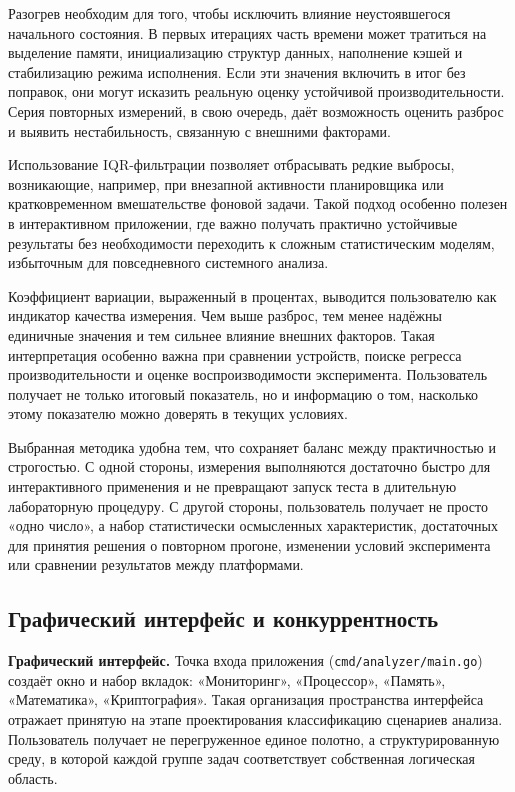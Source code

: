 Разогрев необходим для того, чтобы исключить влияние неустоявшегося начального состояния. В первых итерациях часть времени может тратиться на выделение памяти, инициализацию структур данных, наполнение кэшей и стабилизацию режима исполнения. Если эти значения включить в итог без поправок, они могут исказить реальную оценку устойчивой производительности. Серия повторных измерений, в свою очередь, даёт возможность оценить разброс и выявить нестабильность, связанную с внешними факторами.

Использование IQR-фильтрации позволяет отбрасывать редкие выбросы, возникающие, например, при внезапной активности планировщика или кратковременном вмешательстве фоновой задачи. Такой подход особенно полезен в интерактивном приложении, где важно получать практично устойчивые результаты без необходимости переходить к сложным статистическим моделям, избыточным для повседневного системного анализа.

Коэффициент вариации, выраженный в процентах, выводится пользователю как индикатор качества измерения. Чем выше разброс, тем менее надёжны единичные значения и тем сильнее влияние внешних факторов. Такая интерпретация особенно важна при сравнении устройств, поиске регресса производительности и оценке воспроизводимости эксперимента. Пользователь получает не только итоговый показатель, но и информацию о том, насколько этому показателю можно доверять в текущих условиях.

Выбранная методика удобна тем, что сохраняет баланс между практичностью и строгостью. С одной стороны, измерения выполняются достаточно быстро для интерактивного применения и не превращают запуск теста в длительную лабораторную процедуру. С другой стороны, пользователь получает не просто «одно число», а набор статистически осмысленных характеристик, достаточных для принятия решения о повторном прогоне, изменении условий эксперимента или сравнении результатов между платформами.

\subsection{Графический интерфейс и конкуррентность}

\textbf{Графический интерфейс.} Точка входа приложения (\texttt{cmd/analyzer/main.go}) создаёт окно и набор вкладок: «Мониторинг», «Процессор», «Память», «Математика», «Криптография». Такая организация пространства интерфейса отражает принятую на этапе проектирования классификацию сценариев анализа. Пользователь получает не перегруженное единое полотно, а структурированную среду, в которой каждой группе задач соответствует собственная логическая область.

